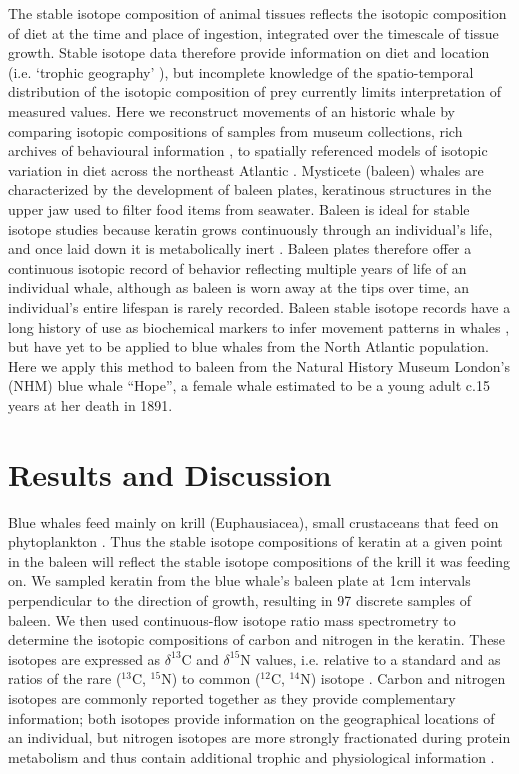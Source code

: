 \documentclass[9pt,twocolumn,twoside,lineno]{pnas-new}
\begin{document}
The stable isotope composition of animal tissues reflects the isotopic composition of diet at the time and place of ingestion, integrated over the timescale of tissue growth. 
Stable isotope data therefore provide information on diet and location (i.e. `trophic geography' \cite{bird2018global}), but incomplete knowledge of the spatio-temporal distribution of the isotopic composition of prey currently limits interpretation of measured values. 
Here we reconstruct movements of an historic whale by comparing isotopic compositions of samples from museum collections, rich archives of behavioural information \cite{lister2011natural}, to spatially referenced models of isotopic variation in diet across the northeast Atlantic \cite{hobson1999tracing,hobson2008tracking,eisenmann2016isotopic}. 
Mysticete (baleen) whales are characterized by the development of baleen plates, keratinous structures in the upper jaw used to filter food items from seawater. 
Baleen is ideal for stable isotope studies because keratin grows continuously through an individual's life, and once laid down it is metabolically inert \cite{best1996stable}. 
Baleen plates therefore offer a continuous isotopic record of behavior reflecting multiple years of life of an individual whale, although as baleen is worn away at the tips over time, an individual's entire lifespan is rarely recorded. 
Baleen stable isotope records have a long history of use as biochemical markers to infer movement patterns in whales \cite{ryan2013stable,best1996stable,hobson1998stable,hobson2008tracking}, but have yet to be applied to blue whales from the North Atlantic population. 
Here we apply this method to baleen from the Natural History Museum London's (NHM) blue whale ``Hope'', a female whale estimated to be a young adult c.15 years at her death in 1891.

\section*{Results and Discussion}

Blue whales feed mainly on krill (Euphausiacea), small crustaceans that feed on phytoplankton \cite{handbook}.
Thus the stable isotope compositions of keratin at a given point in the baleen will reflect the stable isotope compositions of the krill it was feeding on.
We sampled keratin from the blue whale's baleen plate at 1cm intervals perpendicular to the direction of growth, resulting in 97 discrete samples of baleen.
We then used continuous-flow isotope ratio mass spectrometry to determine the isotopic compositions of carbon and nitrogen in the keratin.
These isotopes are expressed as $\delta^{13}$C and $\delta^{15}$N values, i.e. relative to a standard and as ratios of the rare ($^{13}$C, $^{15}$N) to common ($^{12}$C, $^{14}$N) isotope \cite{west2006stable}.
Carbon and nitrogen isotopes are commonly reported together as they provide complementary information; both isotopes provide information on the geographical locations of an individual, but nitrogen isotopes are more strongly fractionated during protein metabolism and thus contain additional trophic and physiological information \cite{west2006stable}.
\end{document}

